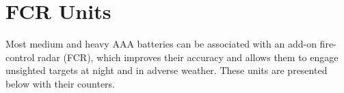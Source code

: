 



\chapter{FCR Units}
\raggedbottom

Most medium and heavy AAA batteries can be associated with an add-on fire-control radar (FCR), which improves their accuracy and allows them to engage unsighted targets at night and in adverse weather. These units are presented below with their counters.


